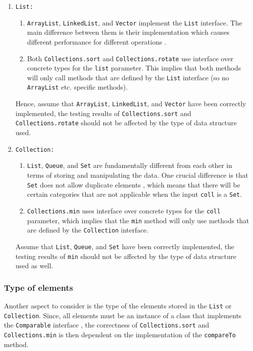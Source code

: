 \documentclass[12pt, a4paper]{article}
\begin{document}
\begin{enumerate}
  \item \texttt{List:}
  \begin{enumerate}
    \item \texttt{ArrayList}, \texttt{LinkedList}, and \texttt{Vector} implement the \texttt{List}
    interface. The main difference between them is their implementation which causes different
    performance for different operations \cite{arraylist, linkedlist, vector}.
    \item Both \texttt{Collections.sort} and \texttt{Collections.rotate} use interface over
    concrete types for the \texttt{list} parameter. This implies that both methods will only call
    methods that are defined by the \texttt{List} interface (so no \texttt{ArrayList} etc. specific
    methods).
  \end{enumerate}
  Hence, assume that \texttt{ArrayList}, \texttt{LinkedList}, and \texttt{Vector} have been
  correctly implemented, the testing results of \texttt{Collections.sort} and
  \texttt{Collections.rotate} should not be affected by the type of data structure used.

  \item \texttt{Collection:}
  \begin{enumerate}
    \item \texttt{List}, \texttt{Queue}, and \texttt{Set} are fundamentally different from each
    other in terms of storing and manipulating the data. One crucial difference is that \texttt{Set}
    does not allow duplicate elements \cite{set}, which means that there will be certain categories
    that are not applicable when the input \texttt{coll} is a \texttt{Set}.
    \item \texttt{Collections.min} uses interface over concrete types for the \texttt{coll}
    parameter, which implies that the \texttt{min} method will only use methods that are defined by
    the \texttt{Collection} interface.
  \end{enumerate}
  Assume that \texttt{List}, \texttt{Queue}, and \texttt{Set} have been correctly implemented, the
  testing results of \texttt{min} should not be affected by the type of data structure used as well.
\end{enumerate}

\subsubsection{Type of elements}
Another aspect to consider is the type of the elements stored in the \texttt{List} or
\texttt{Collection}. Since, all elements must be an instance of a class that implements the
\texttt{Comparable} interface \cite{comparable}, the correctness of \texttt{Collections.sort} and
\texttt{Collections.min} is then dependent on the implementation of the \texttt{compareTo} method.
\end{document}
